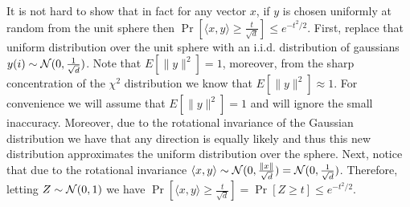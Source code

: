 \documentclass{article}
\begin{document}
It is not hard to show that in fact for any vector $x$, if $y$ is chosen uniformly at random from the unit sphere 
then $\Pr[ \langle x,y \rangle  \ge \frac{t}{\sqrt{d}}] \le e^{-t^2/2}$.
First, replace that uniform distribution over the unit sphere with an i.i.d. distribution of gaussians $y(i)\sim {\mathcal{N}}(0,\frac{1}{\sqrt{d}})$.
Note that $E[\|y\|^2] = 1$, moreover, from the sharp concentration of the $\chi^2$ distribution we know that $E[\|y\|^2] \approx 1$.
For convenience we will assume that $E[\|y\|^2] = 1$ and will ignore the small inaccuracy.
Moreover, due to the rotational invariance of the Gaussian distribution we have that any direction is equally likely and thus this
new distribution approximates the uniform distribution over the sphere.
Next, notice that due to the rotational invariance $\langle x,y \rangle \sim {\mathcal{N}}(0,\frac{\|x\|}{\sqrt{d}}) = {\mathcal{N}}(0,\frac{1}{\sqrt{d}})$.
Therefore, letting $Z \sim {\mathcal{N}}(0,1)$ we have $\Pr[ \langle x,y \rangle  \ge \frac{t}{\sqrt{d}}] = \Pr[Z \ge t] \le e^{-t^2/2}$.





\end{document}
